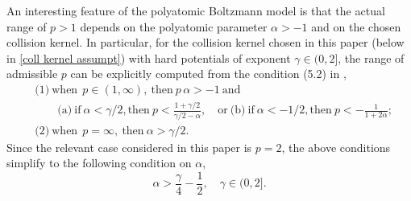 \documentclass[11pt,a4paper]{amsart}
\newcommand{\g}{\gamma}
\begin{document}
An interesting feature of the polyatomic Boltzmann model is that the actual range of $p>1$ depends on the polyatomic parameter $\alpha>-1$ and on the chosen collision kernel. In particular, for the collision kernel chosen in this paper (below in \eqref{coll kernel assumpt}) with hard potentials of exponent $\gamma \in (0,2]$,  the range of admissible $p$ can be explicitly computed from the condition (5.2) in \cite{MC-Alonso-Lp},
\begin{align}
	& \text{(1)} \ \text{when} \ \  p\in(1,\infty), \ \text{then} \ p \, \alpha>-1 \ \text{and} \label{range p} \\
	& \qquad   \text{(a)} \ \text{if} \  \alpha<\gamma/2, \text{then} \ p < \frac{1+\g/2}{\g/2-\alpha},  \quad \text{or} \ 
	    \text{(b)}  \ \text{if}  \ \alpha<-1/2,  \text{then} \  p < - \frac{1 }{1+2 \alpha}; \nonumber\\
		& \text{(2)} \ \text{when} \ \  p = \infty, \ \text{then} \  \alpha > \g/2.  \label{range p inf}
\end{align}
Since the relevant case considered in this paper is $p=2$, the above conditions simplify to the following condition on $\alpha$,
\begin{equation*}
	\alpha > \frac{\gamma}{4} - \frac{1}{2}, \quad \gamma \in (0,2].
\end{equation*}
\end{document}
